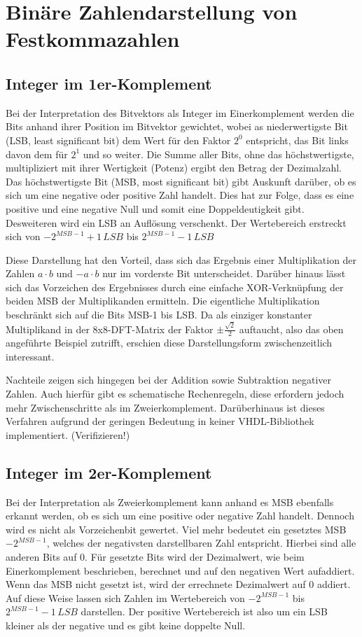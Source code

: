 \section{Binäre Zahlendarstellung von Festkommazahlen}

\subsection{Integer im 1er-Komplement}
Bei der Interpretation des Bitvektors als Integer im Einerkomplement werden die Bits anhand ihrer Position im Bitvektor gewichtet, wobei as niederwertigste Bit 
(LSB, least significant bit) dem Wert für den Faktor $2^0$ entspricht, das Bit links davon dem für $2^1$ und so weiter. Die Summe aller Bits, ohne das höchstwertigste, 
multipliziert mit ihrer Wertigkeit (Potenz) ergibt den Betrag der Dezimalzahl. Das höchstwertigste Bit (MSB, most significant bit) gibt Auskunft darüber, ob es sich 
um eine negative oder positive Zahl handelt. Dies hat zur Folge, dass es eine positive und eine negative Null und somit eine Doppeldeutigkeit gibt. Desweiteren wird
ein LSB an Auflösung verschenkt. Der Wertebereich erstreckt sich von $-2^{MSB-1}+1\,LSB$ bis $2^{MSB-1}-1\,LSB$

Diese Darstellung hat den Vorteil, dass sich das Ergebnis einer Multiplikation der Zahlen $a \cdot b$ und $-a \cdot b$ nur im vorderste Bit unterscheidet. Darüber hinaus
lässt sich das Vorzeichen des Ergebnisses durch eine einfache XOR-Verknüpfung der beiden MSB der Multiplikanden ermitteln. 
Die eigentliche Multiplikation beschränkt sich auf die Bits MSB-1 bis LSB.
Da als einziger konstanter Multiplikand in der 8x8-DFT-Matrix der Faktor $\pm\frac{\sqrt{2}}{2}$ auftaucht, also das oben angeführte Beispiel zutrifft, erschien diese
Darstellungsform zwischenzeitlich interessant.

Nachteile zeigen sich hingegen bei der Addition sowie Subtraktion negativer Zahlen. Auch hierfür gibt es schematische Rechenregeln, diese erfordern jedoch mehr 
Zwischenschritte als im Zweierkomplement. Darüberhinaus ist dieses Verfahren aufgrund der geringen Bedeutung in keiner VHDL-Bibliothek implementiert.
(Verifizieren!)


\subsection{Integer im 2er-Komplement}\label{sec:Integer2erKomplement}
Bei der Interpretation als Zweierkomplement kann anhand es MSB ebenfalls erkannt werden, ob es sich um eine positive oder negative Zahl handelt. Dennoch wird es nicht
als Vorzeichenbit gewertet. Viel mehr bedeutet ein gesetztes MSB $-2^{MSB-1}$, welches der negativsten darstellbaren Zahl entspricht. Hierbei sind alle anderen 
Bits auf 0. Für gesetzte Bits wird der Dezimalwert, wie beim Einerkomplement beschrieben, berechnet und auf den negativen Wert aufaddiert. Wenn das MSB nicht gesetzt
ist, wird der errechnete Dezimalwert auf 0 addiert. Auf diese Weise lassen sich Zahlen im Wertebereich von $-2^{MSB-1}$ bis $2^{MSB-1}-1 \,LSB$ darstellen. Der positive
Wertebereich ist also um ein LSB kleiner als der negative und es gibt keine doppelte Null.


